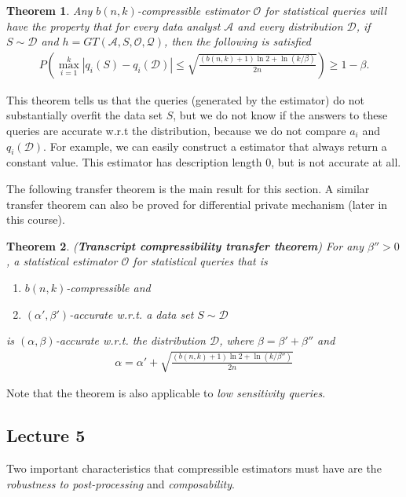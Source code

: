 \documentclass[]{article}
\newtheorem{theorem}{Theorem}[section]
\begin{document}
\begin{theorem}
	Any $b(n,k)$-compressible estimator $\mathcal{O}$ for statistical queries will have the property that for every data analyst $\mathcal{A}$ and every distribution $\mathcal{D}$, if $S \sim \mathcal{D}$ and $h=GT(\mathcal{A},S,\mathcal{O},\mathcal{Q})$, then the following is satisfied 
	\begin{align*}
		P\left(\max_{i=1}^k |q_i(S) - q_i(\mathcal{D})| \le \sqrt{\frac{(b(n,k)+1)\ln 2 + \ln (k/\beta)}{2n}}\right) \ge 1 - \beta.
	\end{align*} 
\end{theorem}
This theorem tells us that the queries (generated by the estimator) do not substantially overfit the data set $S$, but we do not know if the answers to these queries are accurate w.r.t the distribution, because we do not compare $a_i$ and $q_i(\mathcal{D})$. For example, we can easily construct a estimator that always return a constant value. This estimator has description length $0$, but is not accurate at all. 

The following transfer theorem is the main result for this section. A similar transfer theorem can also be proved for differential private mechanism (later in this course). 

\begin{theorem} (\textbf{Transcript compressibility transfer theorem})
	For any $\beta'' > 0$, a statistical estimator $\mathcal{O}$ for statistical queries that is 
	\begin{enumerate}
		\item $b(n,k)$-compressible and 
		\item $(\alpha',\beta')$-accurate w.r.t. a data set $S \sim \mathcal{D}$
	\end{enumerate}
	is $(\alpha,\beta)$-accurate w.r.t. the distribution $\mathcal{D}$, where $\beta = \beta'+\beta''$ and 
	\begin{align*}
		\alpha = \alpha' + \sqrt{\frac{(b(n,k)+1)\ln 2 + \ln (k/\beta'')}{2n}}
	\end{align*}
\end{theorem}
Note that the theorem is also applicable to \textit{low sensitivity queries}.

\subsection{Lecture 5}

Two important characteristics that compressible estimators must have are the \textit{robustness to post-processing} and \textit{composability}.
\end{document}
